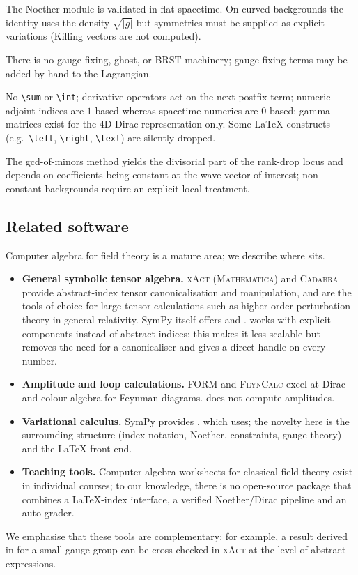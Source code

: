 \begin{description}[leftmargin=1.2em]
\item[Noether currents on curved backgrounds.] The Noether module is validated in flat spacetime. On curved backgrounds the identity uses the density $\sqrt{|g|}$ but symmetries must be supplied as explicit variations (Killing vectors are not computed).
\item[Gauge fixing and BRST.] There is no gauge-fixing, ghost, or BRST machinery; gauge fixing terms may be added by hand to the Lagrangian.
\item[Parser.] No \verb|\sum| or \verb|\int|; derivative operators act on the next postfix term; numeric adjoint indices are $1$-based whereas spacetime numerics are $0$-based; gamma matrices exist for the $4$D Dirac representation only. Some \LaTeX{} constructs (e.g.\ \verb|\left|, \verb|\right|, \verb|\text|) are silently dropped.
\item[Dispersion analysis.] The gcd-of-minors method yields the divisorial part of the rank-drop locus and depends on coefficients being constant at the wave-vector of interest; non-constant backgrounds require an explicit local treatment.
\end{description}

\subsection{Related software}
\label{sec:related}

Computer algebra for field theory is a mature area; we describe where \fs{} sits.
\begin{itemize}
\item \textbf{General symbolic tensor algebra.} \textsc{xAct} (\textsc{Mathematica}) and \textsc{Cadabra} \cite{Peeters2007} provide abstract-index tensor canonicalisation and manipulation, and are the tools of choice for large tensor calculations such as higher-order perturbation theory in general relativity. SymPy itself offers  and . \fs{} works with explicit components instead of abstract indices; this makes it less scalable but removes the need for a canonicaliser and gives a direct handle on every number.
\item \textbf{Amplitude and loop calculations.} \textsc{FORM} \cite{Vermaseren2000} and \textsc{FeynCalc} \cite{Mertig1991,Shtabovenko2016} excel at Dirac and colour algebra for Feynman diagrams. \fs{} does not compute amplitudes.
\item \textbf{Variational calculus.} SymPy provides , which \fs{} uses; the novelty here is the surrounding structure (index notation, Noether, constraints, gauge theory) and the \LaTeX{} front end.
\item \textbf{Teaching tools.} Computer-algebra worksheets for classical field theory exist in individual courses; to our knowledge, there is no open-source package that combines a \LaTeX{}-index interface, a verified Noether/Dirac pipeline and an auto-grader.
\end{itemize}
We emphasise that these tools are complementary: for example, a result derived in \fs{} for a small gauge group can be cross-checked in \textsc{xAct} at the level of abstract expressions.

